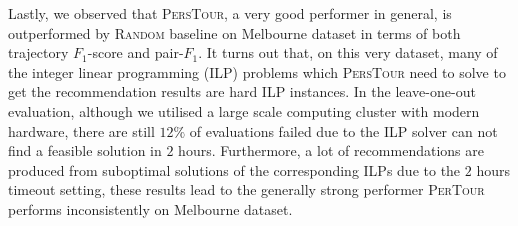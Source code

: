 Lastly, we observed that \textsc{PersTour}, a very good performer in general, is outperformed by \textsc{Random} baseline
on Melbourne dataset in terms of both trajectory $F_1$-score and pair-$F_1$.
It turns out that, on this very dataset, many of the integer linear programming (ILP) problems
which \textsc{PersTour} need to solve to get the recommendation results are hard ILP instances.
In the leave-one-out evaluation, although we utilised a large scale computing cluster with modern hardware,
there are still $12\%$ of evaluations failed due to the ILP solver can not find a feasible solution in $2$ hours.
Furthermore, a lot of recommendations are produced from suboptimal solutions of the corresponding ILPs due to
the $2$ hours timeout setting, these results lead to the generally strong performer \textsc{PerTour} performs
inconsistently on Melbourne dataset.
